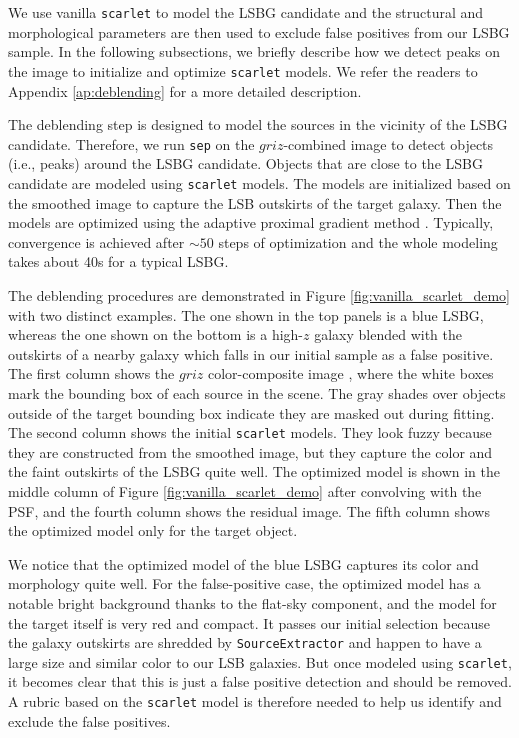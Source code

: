 \documentclass[twocolumn,astrosymb,twocolappendix]{aastex631}
\newcommand{\code}[1]{\texttt{#1}}
\begin{document}
\begin{CJK*}{UTF8}{gbsn}
We use vanilla \code{scarlet} to model the LSBG candidate and the structural and morphological parameters are then used to exclude false positives from our LSBG sample. In the following subsections, we briefly describe how we detect peaks on the image to initialize and optimize \code{scarlet} models. We refer the readers to Appendix \ref{ap:deblending} for a more detailed description. 

The deblending step is designed to model the sources in the vicinity of the LSBG candidate. Therefore, we run \code{sep} on the $griz$-combined image to detect objects (i.e., peaks) around the LSBG candidate. Objects that are close to the LSBG candidate are modeled using \code{scarlet} models. The models are initialized based on the smoothed image to capture the LSB outskirts of the target galaxy. Then the models are optimized using the adaptive proximal gradient method \citep{Melchior2019}. Typically, convergence is achieved after $\sim 50$ steps of optimization and the whole modeling takes about 40s for a typical LSBG.

The deblending procedures are demonstrated in Figure \ref{fig:vanilla_scarlet_demo} with two distinct examples. The one shown in the top panels is a blue LSBG, whereas the one shown on the bottom is a high-$z$ galaxy blended with the outskirts of a nearby galaxy which falls in our initial sample as a false positive. The first column shows the $griz$ color-composite image \citep{Lupton2004}, where the white boxes mark the bounding box of each source in the scene. The gray shades over objects outside of the target bounding box indicate they are masked out during fitting. The second column shows the initial \code{scarlet} models. They look fuzzy because they are constructed from the smoothed image, but they capture the color and the faint outskirts of the LSBG quite well. The optimized model is shown in the middle column of Figure \ref{fig:vanilla_scarlet_demo} after convolving with the PSF, and the fourth column shows the residual image. The fifth column shows the optimized model only for the target object. 

We notice that the optimized model of the blue LSBG captures its color and morphology quite well. For the false-positive case, the optimized model has a notable bright background thanks to the flat-sky component, and the model for the target itself is very red and compact. It passes our initial selection because the galaxy outskirts are shredded by \code{SourceExtractor} and happen to have a large size and similar color to our LSB galaxies. But once modeled using \code{scarlet}, it becomes clear that this is just a false positive detection and should be removed. A rubric based on the \code{scarlet} model is therefore needed to help us identify and exclude the false positives. 


\end{CJK*}
\end{document}
